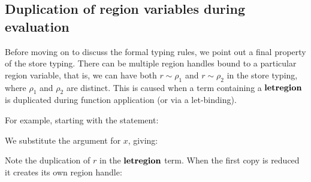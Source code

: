 \clearpage{}
\subsection{Duplication of region variables during evaluation}
Before moving on to discuss the formal typing rules, we point out a final property of the store typing. There can be multiple region handles bound to a particular region variable, that is, we can have both $r \sim \rho_1$ and $r \sim \rho_2$ in the store typing, where $\rho_1$ and $\rho_2$ are distinct. This is caused when a term containing a $\textrm{\textbf{letregion}}$ is duplicated during function application (or via a let-binding).

For example, starting with the statement:


We substitute the argument for $x$, giving:


Note the duplication of $r$ in the $\textrm{\textbf{letregion}}$ term. When the first copy is reduced it creates its own region handle:



